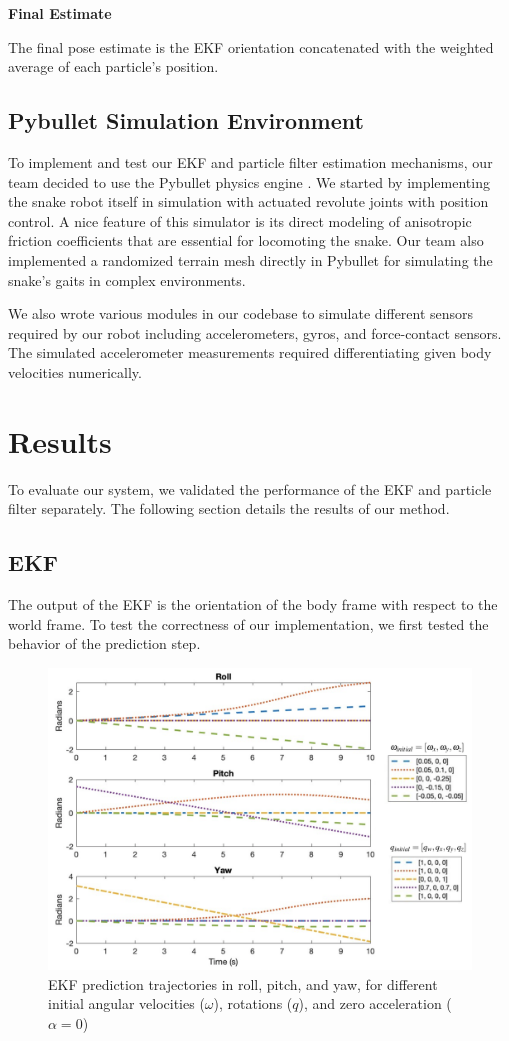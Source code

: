 \documentclass[letterpaper, 10 pt, conference]{ieeeconf}  %
\begin{document}
\noindent \textbf{Final Estimate}

\noindent The final pose estimate is the EKF orientation concatenated with the weighted average of each particle's position.

\subsection{Pybullet Simulation Environment}
To implement and test our EKF and particle filter estimation mechanisms, our team decided to use the Pybullet physics engine \cite{pybullet}. We started by implementing the snake robot itself in simulation with actuated revolute joints with position control. A nice feature of this simulator is its direct modeling of anisotropic friction coefficients that are essential for locomoting the snake. Our team also implemented a randomized terrain mesh directly in Pybullet for simulating the snake's gaits in complex environments. 

We also wrote various modules in our codebase to simulate different sensors required by our robot including accelerometers, gyros, and force-contact sensors. The simulated accelerometer measurements required differentiating given body velocities numerically.  


\section{Results}
To evaluate our system, we validated the performance of the EKF and particle filter separately. The following section details the results of our method.

\subsection{EKF}
The output of the EKF is the orientation of the body frame with respect to the world frame. To test the correctness of our implementation, we first tested the behavior of the prediction step.

\begin{figure}[H]
    \centering
    \includegraphics[width = 0.85\linewidth]{ekf_predict.png}
    \caption{EKF prediction trajectories in roll, pitch, and yaw, for different initial angular velocities ($\omega$), rotations ($q$), and zero acceleration ($\alpha=0$)}
    \label{fig:ekf_predict}
\end{figure}
\end{document}
